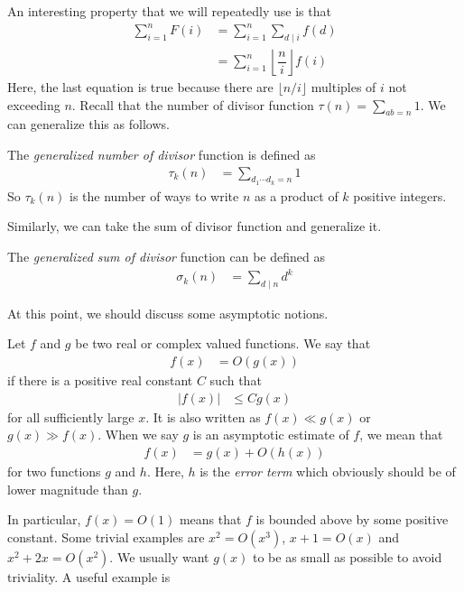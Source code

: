 \documentclass[elemannt.tex]{subfile}
\begin{document}
	An interesting property that we will repeatedly use is that
		\begin{align*}
			\sum_{i=1}^{n}F(i)
				& = \sum_{i=1}^{n}\sum_{d\mid i}f(d)\\
				& = \sum_{i=1}^{n}\left\lfloor{\dfrac{n}{i}}\right\rfloor f(i)
		\end{align*}
	Here, the last equation is true because there are $\lfloor{n/i}\rfloor$ multiples of $i$ not exceeding $n$. Recall that the number of divisor function $\tau(n)=\sum_{ab=n}1$. We can generalize this as follows.
		\begin{definition}
			The \textit{generalized number of divisor} function is defined as
				\begin{align*}
					\tau_{k}(n)
						& = \sum_{d_{1}\cdots d_{k}=n}1
				\end{align*}
			So $\tau_{k}(n)$ is the number of ways to write $n$ as a product of $k$ positive integers. 
		\end{definition}
	Similarly, we can take the sum of divisor function and generalize it.
		\begin{definition}
			The \textit{generalized sum of divisor} function can be defined as
				\begin{align*}
					\sigma_{k}(n)
						& = \sum_{d\mid n}d^{k}
				\end{align*}
		\end{definition}
	At this point, we should discuss some asymptotic notions.
		\begin{definition}[Big O]
			Let $f$ and $g$ be two real or complex valued functions. We say that
				\begin{align*}
					f(x)
					& = O(g(x))
				\end{align*}
			if there is a positive real constant $C$ such that
				\begin{align*}
					|f(x)|
					& \leq Cg(x)
				\end{align*}
			for all sufficiently large $x$. It is also written as $f(x)\ll g(x)$  or $g(x)\gg f(x)$. When we say $g$ is an asymptotic estimate of $f$, we mean that
				\begin{align*}
					f(x)
						& = g(x)+O(h(x))
				\end{align*}
			for two functions $g$ and $h$. Here, $h$ is the \textit{error term} which obviously should be of lower magnitude than $g$.
		\end{definition}
	In particular, $f(x)=O(1)$ means that $f$ is bounded above by some positive constant. Some trivial examples are $x^{2}=O(x^{3})$, $x+1=O(x)$ and $x^{2}+2x=O(x^{2})$. We usually want $g(x)$ to be as small as possible to avoid triviality. A useful example is
\end{document}
